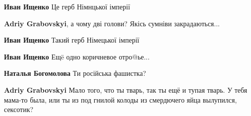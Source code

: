 \begin{itemize}
\begin{itemize}
 
\textbf{Иван Ищенко} Це герб Німнцької імперії

 
\textbf{Adriy Grabovskyi}, а чому дві голови? Якісь сумніви закрадаються...

 
\textbf{Иван Ищенко} Такий герб Німецької імперії

 
\textbf{Иван Ищенко}
Ещë одно коричневое отро@ье...

 
\textbf{Наталья Богомолова} Ти російська фашистка?

 
\textbf{Adriy Grabovskyi} Мало того, что ты тварь, так ты ещё и тупая тварь. У тебя мама-то была, или ты из под гнилой колоды из смердючего яйца вылупился, сексотик?

 

\end{itemize}
\end{itemize}

